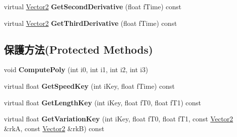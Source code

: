\begin{DoxyCompactItemize}
\item 
virtual \hyperlink{class_i_dream_sky_1_1_vector2}{Vector2} {\bfseries Get\+Second\+Derivative} (float f\+Time) const \hypertarget{class_i_dream_sky_1_1_t_c_b_spline2_a952f787381f8da4d25ad00508faf2f34}{}\label{class_i_dream_sky_1_1_t_c_b_spline2_a952f787381f8da4d25ad00508faf2f34}

\item 
virtual \hyperlink{class_i_dream_sky_1_1_vector2}{Vector2} {\bfseries Get\+Third\+Derivative} (float f\+Time) const \hypertarget{class_i_dream_sky_1_1_t_c_b_spline2_a4e609e482ea262fc949aefa77cc80daf}{}\label{class_i_dream_sky_1_1_t_c_b_spline2_a4e609e482ea262fc949aefa77cc80daf}

\end{DoxyCompactItemize}
\subsection*{保護方法(Protected Methods)}
\begin{DoxyCompactItemize}
\item 
void {\bfseries Compute\+Poly} (int i0, int i1, int i2, int i3)\hypertarget{class_i_dream_sky_1_1_t_c_b_spline2_abfa7b54d1f24e2640d7001f3a4d319c5}{}\label{class_i_dream_sky_1_1_t_c_b_spline2_abfa7b54d1f24e2640d7001f3a4d319c5}

\item 
virtual float {\bfseries Get\+Speed\+Key} (int i\+Key, float f\+Time) const \hypertarget{class_i_dream_sky_1_1_t_c_b_spline2_a7cc92f0eaf12fda7e33495970727ce68}{}\label{class_i_dream_sky_1_1_t_c_b_spline2_a7cc92f0eaf12fda7e33495970727ce68}

\item 
virtual float {\bfseries Get\+Length\+Key} (int i\+Key, float f\+T0, float f\+T1) const \hypertarget{class_i_dream_sky_1_1_t_c_b_spline2_ad2f65e37459d35c17a5897df706ed3b7}{}\label{class_i_dream_sky_1_1_t_c_b_spline2_ad2f65e37459d35c17a5897df706ed3b7}

\item 
virtual float {\bfseries Get\+Variation\+Key} (int i\+Key, float f\+T0, float f\+T1, const \hyperlink{class_i_dream_sky_1_1_vector2}{Vector2} \&rkA, const \hyperlink{class_i_dream_sky_1_1_vector2}{Vector2} \&rkB) const \hypertarget{class_i_dream_sky_1_1_t_c_b_spline2_a9f2572e012426fcfd22e154fc041c433}{}\label{class_i_dream_sky_1_1_t_c_b_spline2_a9f2572e012426fcfd22e154fc041c433}

\end{DoxyCompactItemize}
